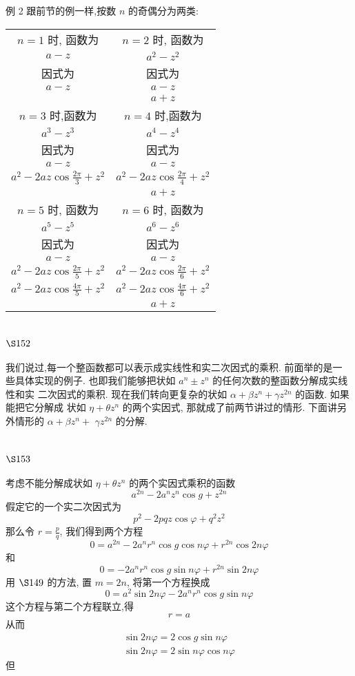 例 2 跟前节的例一样,按数 $n$ 的奇偶分为两类:

\begin{tabular}{c|c}
\hline$n=1$ 时, 函数为 & $n=2$ 时, 函数为 \\
$a-z$ & $a^{2}-z^{2}$ \\
因式为 & 因式为 \\
$a-z$ & $a-z$ \\
& $a+z$ \\
$n=3$ 时,函数为 & $n=4$ 时,函数为 \\
$a^{3}-z^{3}$ & $a^{4}-z^{4}$ \\
因式为 & 因式为 \\
$a-z$ & $a-z$ \\
$a^{2}-2 a z \cos \frac{2 \pi}{3}+z^{2}$ & $a^{2}-2 a z \cos \frac{2 \pi}{4}+z^{2}$ \\
& $a+z$ \\
$n=5$ 时, 函数为 & $n=6$ 时, 函数为 \\
$a^{5}-z^{5}$ & $a^{6}-z^{6}$ \\
因式为 & 因式为 \\
$a-z$ & $a-z$ \\
$a^{2}-2 a z \cos \frac{2 \pi}{5}+z^{2}$ & $a^{2}-2 a z \cos \frac{2 \pi}{6}+z^{2}$ \\
$a^{2}-2 a z \cos \frac{4 \pi}{5}+z^{2}$ & $a^{2}-2 a z \cos \frac{4 \pi}{6}+z^{2}$ \\
& $a+z$ \\
\hline
\end{tabular}

\section{$\S 152$}

我们说过,每一个整函数都可以表示成实线性和实二次因式的乘积. 前面举的是一 些具体实现的例子. 也即我们能够把状如 $a^{n} \pm z^{n}$ 的任何次数的整函数分解成实线性和实 二次因式的乘积. 现在我们转向更复杂的状如 $\alpha+\beta z^{n}+\gamma z^{2 n}$ 的函数. 如果能把它分解成 状如 $\eta+\theta z^{n}$ 的两个实因式, 那就成了前两节讲过的情形. 下面讲另外情形的 $\alpha+\beta z^{n}+$ $\gamma z^{2 n}$ 的分解. 

\section{$\S 153$}

考虑不能分解成状如 $\eta+\theta z^{n}$ 的两个实因式乘积的函数
\[
a^{2 n}-2 a^{n} z^{n} \cos g+z^{2 n}
\]
假定它的一个实二次因式为
\[
p^{2}-2 p q z \cos \varphi+q^{2} z^{2}
\]
那么令 $r=\frac{p}{q}$, 我们得到两个方程
\[
0=a^{2 n}-2 a^{n} r^{n} \cos g \cos n \varphi+r^{2 n} \cos 2 n \varphi
\]
和
\[
0=-2 a^{n} r^{n} \cos g \sin n \varphi+r^{2 n} \sin 2 n \varphi
\]
用 $\S 149$ 的方法, 置 $m=2 n$, 将第一个方程换成
\[
0=a^{2} \sin 2 n \varphi-2 a^{n} r^{n} \cos g \sin n \varphi
\]
这个方程与第二个方程联立,得
\[
r=a
\]
从而
\[
\begin{gathered}
\sin 2 n \varphi=2 \cos g \sin n \varphi \\
\sin 2 n \varphi=2 \sin n \varphi \cos n \varphi
\end{gathered}
\]
但

